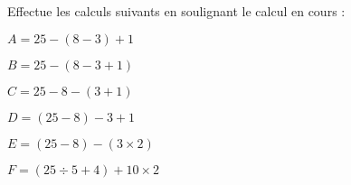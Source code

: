\vspace*{1em}
\newpage



\begin{exercice}
Effectue les calculs suivants en soulignant le calcul en cours :
 \begin{colitemize}{2}
\item $A = 25 - ( 8 - 3 ) + 1$

\dotfill

\dotfill

\dotfill

\item $B = 25 - ( 8 - 3 + 1)$

\dotfill

\dotfill

\dotfill

\item $C = 25 - 8 - ( 3 + 1 )$

\dotfill

\dotfill

\dotfill

\item $D = ( 25 - 8 ) - 3 + 1$

\dotfill

\dotfill

\dotfill

\item $E = ( 25 - 8 ) - ( 3 \times 2 )$

\dotfill

\dotfill

\dotfill

\item {\small $F = ( 25 \div 5 + 4 ) + 10 \times 2$}

\dotfill

\dotfill

\dotfill
 \end{colitemize}
\end{exercice}


